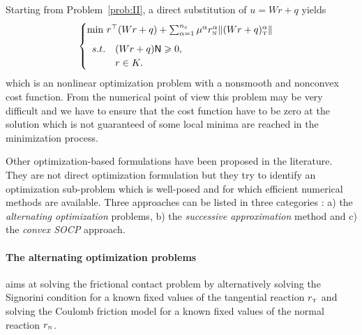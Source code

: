 Starting from Problem~\ref{prob:II}, a direct substitution of $u = Wr +q$ yields
\begin{equation}
  \label{eq:opt-3}
  \begin{cases}
    \min\, r^\top (Wr+q) + \sum _{\alpha=1}^{n_c} \mu^\alpha r_\n^\alpha \|(Wr+q)_\t^\alpha\| \\[2mm]
    \begin{array}{ll}
      s.t. &(W r + q){\sf N} \geq 0, \\
      &r \in K.
    \end{array}
  \end{cases}
\end{equation}
which is an nonlinear optimization problem with a nonsmooth and nonconvex cost function.  From the numerical point of view this problem may be very difficult and we have to ensure that the cost function have to be zero at the solution which is not guaranteed of some local minima are reached in the minimization process.

Other optimization-based formulations have been proposed in the literature. They are not direct optimization formulation but they try to identify an optimization sub-problem which is well-posed and for which efficient numerical methods are available. Three approaches can be listed in three categories : a)  the \textit{alternating optimization} problems, b) the \textit{successive approximation} method and c)  the \textit{convex SOCP} approach.


\paragraph{The alternating optimization problems} aims at solving the frictional contact problem by alternatively solving the Signorini condition for a known fixed values of the tangential reaction $r_{\hbox{\tiny{T}}}$ and solving the Coulomb friction model for a known fixed values of the normal reaction $r_{\hbox{\tiny{N}}}$. 

